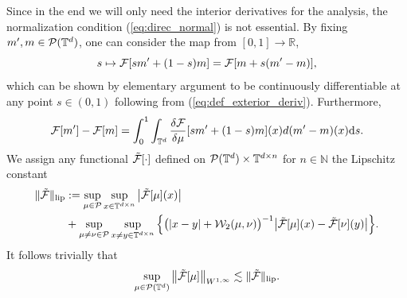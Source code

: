 Since in the end we will only need the interior derivatives for the analysis, the normalization condition (\ref{eq:direc_normal}) is not essential. By fixing $m', m \in \mathcal{P}(\mathbb{T}^d)$, one can consider the map 
from $[0,1] \to \mathbb{R}$, 
\[
s \mapsto \mathcal{F}[s m' + (1 - s)m ] = \mathcal{F}[m + s(m' - m)],
\]
which can be shown by elementary argument to be continuously differentiable at any point $s \in (0,1)$ following from (\ref{eq:def_exterior_deriv}). Furthermore,  
\begin{equation}\label{eq:def_wasser_deriv_integral}
\mathcal{F}[m'] - \mathcal{F}[m] = \int_0^1 \int_{\mathbb{T}^d} \frac{\delta \mathcal{F}}{\delta \mu}[s m' + (1 - s)m](x)  d(m' - m)(x)\mathrm{d}s.
\end{equation}
We assign any functional $\tilde{\mathcal{F}}[\cdot]$ defined on $\mathcal{P}(\mathbb{T}^d) \times \mathbb{T}^{d \times n}$ for $n \in \mathbb{N}$ the Lipschitz constant 
\begin{equation}\label{eq:def_lip_functional}
\begin{split}
\|\tilde{\mathcal{F}}\|_{\operatorname{lip}} & := \sup_{\mu \in \mathcal{P}}\sup_{x \in \mathbb{T}^{d \times n}} \big|\tilde{\mathcal{F}}[\mu](x)\big|\\
& + \sup_{\mu \neq \nu \in \mathcal{P}}\sup_{x \neq y \in \mathbb{T}^{d \times n}} \Big\{\big(|x-y| + \mathcal{W}_2(\mu,\nu)\big)^{-1} \big|\tilde{\mathcal{F}}[\mu](x) - \tilde{\mathcal{F}}[\nu](y)\big|\Big\}.
 \end{split}
\end{equation}
It follows trivially that
\begin{equation}\label{eq:Lip_imp_W1inf}
\sup_{\mu \in \mathcal{P}(\mathbb{T}^d)} \big\|\tilde{\mathcal{F}}[\mu]\big\|_{W^{1,\infty}} \lesssim \|\tilde{\mathcal{F}}\|_{\operatorname{lip}}.
\end{equation}


